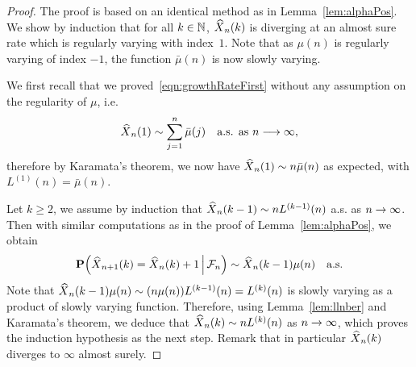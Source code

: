 \documentclass[AHL,Unicode,longabstracts,published]{cedram}
\newcommand{\bbN}{\mathbb{N}}
\renewcommand{\P}{\mathbf{P}}
\newcommand{\clF}{\mathcal{F}}
\let\originalleft\left
\let\originalright\right
\renewcommand{\left}{\mathopen{}\mathclose\bgroup\originalleft}
\renewcommand{\right}{\aftergroup\egroup\originalright}
\let\oldin\in
\renewcommand{\in}{\mathchoice{\oldin}{\oldin}{\,\oldin\,}{\,\oldin\,}}
\renewcommand*{\to}{\mathchoice{\longrightarrow}{\rightarrow}{\rightarrow}{\rightarrow}}
\let\oldhat\hat
\renewcommand*{\hat}[1]{\mathchoice{\widehat{#1}}{\widehat{#1}}{\oldhat{#1}}{\oldhat{#1}}}
\begin{document}
\begin{proof}
The proof is based on an identical method as in Lemma~\ref{lem:alphaPos}. We show by induction that for all $k \in \bbN$, $\hat{X}_n(k)$ is diverging at an almost sure rate which is regularly varying with index~$1$. Note that as $\mu(n)$ is regularly varying of index $-1$, the function $\bar{\mu}(n)$ is now slowly varying.

We first recall that we proved~\eqref{eqn:growthRateFirst} without any assumption on the regularity of $\mu$, i.e.
\[
\hat{X}_n(1) \sim \sum_{j=1}^n \bar{\mu}(j) \quad \text{a.s. as }n \to \infty,
\]
therefore by Karamata's theorem, we now have $\hat{X}_n(1) \sim n \bar{\mu}(n)$ as expected, with $L^{(1)}(n) = \bar{\mu}(n)$.

Let $k \geq 2$, we assume by induction that $\hat{X}_n(k-1) \sim nL^{(k-1)}(n)$ a.s. as $n \to \infty$. Then with similar computations as in the proof of Lemma~\ref{lem:alphaPos}, we obtain
\[
\P\left(\hat{X}_{n+1}(k) = \hat{X}_n(k) + 1\,\middle|\, \clF_n\right) \sim \hat{X}_n(k-1) \mu(n) \quad \text{a.s.}
\]
Note that $\hat{X}_n(k-1)\mu(n) \sim (n \mu(n)) L^{(k-1)}(n) = L^{(k)}(n)$ is slowly varying as a product of slowly varying function. Therefore, using Lemma~\ref{lem:llnber} and Karamata's theorem, we deduce that $\hat{X}_n(k) \sim n L^{(k)}(n)$ as $n\to \infty$, which proves the induction hypothesis as the next step. Remark that in particular $\hat{X}_n(k)$ diverges to $\infty$ almost surely.
\end{proof}




\end{document}
